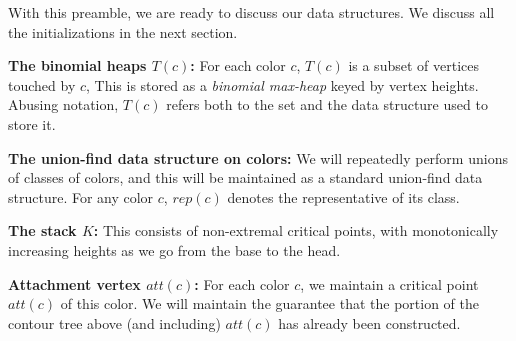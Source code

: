 \documentclass[11pt]{article}
\newcommand{\ignore}[1]{}
\theoremstyle{definition}
\newcommand{\col}{col}
\newcommand{\h}{att}
\newcommand{\mcol}{mcol}
\newcommand{\rep}{rep}
\newcommand{\st}{K}
\newcommand{\touch}{T}
\begin{document}
With this preamble, we are ready to discuss our data structures. We discuss all the initializations
in the next section.

\medskip
\noindent
{\bf The binomial heaps $\touch(c)$:} For each color $c$, $\touch(c)$ is a subset of vertices touched by $c$,
This is stored as a \emph{binomial max-heap} keyed by vertex heights. Abusing notation, $\touch(c)$ refers
both to the set and the data structure used to store it.

%

\medskip
\noindent
{\bf The union-find data structure on colors:} We will repeatedly perform unions
of classes of colors, and this will be maintained as a standard union-find data structure.
For any color $c$, $\rep(c)$ denotes the representative of its class. 

\medskip
\noindent
{\bf The stack $\st$:} This consists of non-extremal critical points, with monotonically increasing
heights as we go from the base to the head.
\ignore{
Each point $x \in \st$ has an associated subset of $\col(x)$, denoted $\mcol(x)$.
Both $\mcol(x)$ and its complement are stored as hash table. So lookups, inserts, and deletes
are in these sets are all constant time operations. The stack is guaranteed to satisfy 
the following invariants.
\begin{asparaitem}
	\item For every $x \in \st$: For every $c \in \mcol(x)$, $x$ is the highest element
	in $T(c)$. Furthermore, $c = \rep(c)$.
	\item Consider $x, y \in \st$ such that $y$ was pushed on $x$. There exists $c \in \col(x) \setminus
	\mcol(x)$ such that $x$ is not highest in $T(c)$ but $y$ is highest in $T(c)$.
\end{asparaitem}
}

\medskip
\noindent
{\bf Attachment vertex $\h(c)$:} For each color $c$, we maintain a critical point $\h(c)$ of this color.
We will maintain the guarantee that the portion of the contour tree above (and including) $\h(c)$ has already been constructed.
\end{document}
